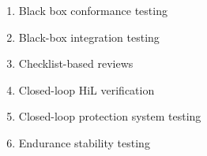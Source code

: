     \label{orth-test-exs}
    \begin{enumerate}
        \item Black box conformance testing \citep[p.~25]{JardEtAl1999}
        \item Black-box integration testing \citep[pp.~345--346]{SakamotoEtAl2013}
        \item Checklist-based reviews \citepISTQB{}
        \item Closed-loop HiL verification \citep[p.~6]{PreußeEtAl2012}
        \item Closed-loop protection system testing \citep[p.~331]{ForsythEtAl2004}
        \item Endurance stability testing \citep[p.~55]{Firesmith2015}

\end{enumerate}
